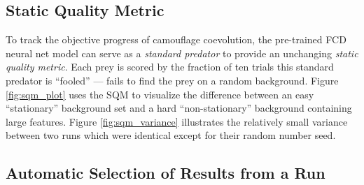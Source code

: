 \documentclass[letterpaper]{article}
\newcommand{\jargon}[1]{\textit{#1}}
\begin{document}

\subsection{Static Quality Metric}
\label{subsec:sqm}

To track the objective progress of camouflage coevolution, the pre-trained FCD neural net model can serve as a \jargon{standard predator} to provide an unchanging \jargon{static quality metric}. Each prey is scored by the fraction of ten trials this standard predator is ``fooled'' --- fails to find the prey on a random background. Figure \ref{fig:sqm_plot} uses the SQM to visualize the difference between an easy ``stationary'' background set and a hard ``non-stationary'' background containing large features. Figure \ref{fig:sqm_variance} illustrates the relatively small variance between two runs which were identical except for their random number seed.
\par


\subsection{Automatic Selection of Results from a Run}
\label{subsec:auto_curation}
\end{document}
